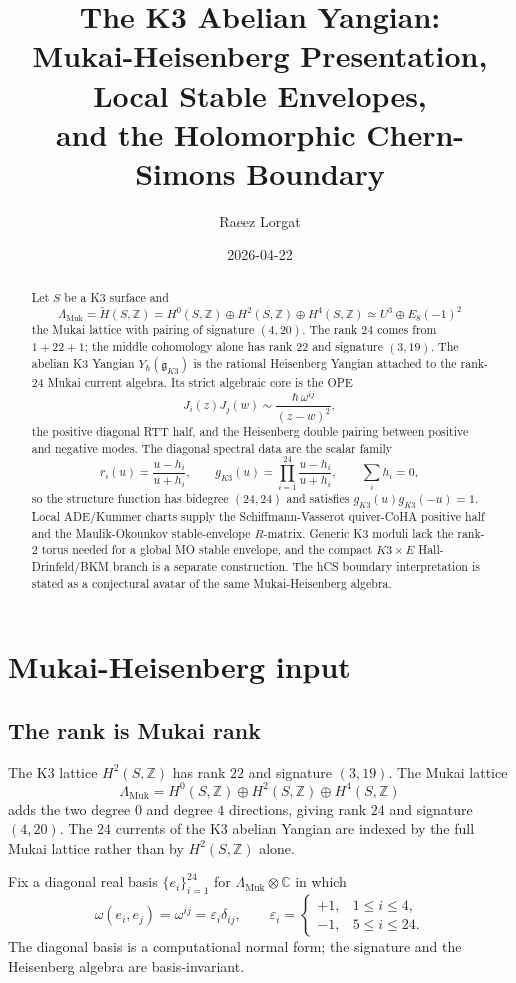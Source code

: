 \documentclass[11pt]{article}
\title{The K3 Abelian Yangian:\\
Mukai-Heisenberg Presentation, Local Stable Envelopes,\\
and the Holomorphic Chern-Simons Boundary}
\author{Raeez Lorgat}
\date{2026-04-22}
\theoremstyle{definition}
\newcommand{\C}{\mathbb{C}}
\newcommand{\Z}{\mathbb{Z}}
\renewcommand{\gg}{\mathfrak{g}}
\newcommand{\Lmuk}{\Lambda_{\mathrm{Muk}}}
\newcommand{\YgK}{Y_\hbar(\gg_{K3})}
\begin{document}
\maketitle

\begin{abstract}
Let $S$ be a K3 surface and
\[
  \Lmuk=\widetilde H(S,\Z)=H^0(S,\Z)\oplus H^2(S,\Z)\oplus H^4(S,\Z)
  \simeq U^3\oplus E_8(-1)^2
\]
the Mukai lattice with pairing of signature $(4,20)$. The rank $24$
comes from $1+22+1$; the middle cohomology alone has rank $22$ and
signature $(3,19)$. The abelian K3 Yangian $\YgK$ is the rational
Heisenberg Yangian attached to the rank-$24$ Mukai current algebra. Its
strict algebraic core is the OPE
\[
  J_i(z)J_j(w)\sim \frac{\hbar\,\omega^{ij}}{(z-w)^2},
\]
the positive diagonal RTT half, and the Heisenberg double pairing between
positive and negative modes. The diagonal spectral data are the scalar
family
\[
  r_i(u)=\frac{u-h_i}{u+h_i}, \qquad
  g_{K3}(u)=\prod_{i=1}^{24}\frac{u-h_i}{u+h_i},
  \qquad \sum_i h_i=0,
\]
so the structure function has bidegree $(24,24)$ and satisfies
$g_{K3}(u)g_{K3}(-u)=1$. Local ADE/Kummer charts supply the
Schiffmann-Vasserot quiver-CoHA positive half and the Maulik-Okounkov
stable-envelope $R$-matrix. Generic K3 moduli lack the rank-$2$ torus
needed for a global MO stable envelope, and the compact $K3\times E$
Hall-Drinfeld/BKM branch is a separate construction. The hCS boundary
interpretation is stated as a conjectural avatar of the same
Mukai-Heisenberg algebra.
\end{abstract}

\tableofcontents

\section{Mukai-Heisenberg input}
\label{sec:mukai-heisenberg-input}

\subsection{The rank is Mukai rank}

The K3 lattice $H^2(S,\Z)$ has rank $22$ and signature $(3,19)$. The
Mukai lattice
\[
  \Lmuk=H^0(S,\Z)\oplus H^2(S,\Z)\oplus H^4(S,\Z)
\]
adds the two degree $0$ and degree $4$ directions, giving rank $24$ and
signature $(4,20)$. The $24$ currents of the K3 abelian Yangian are
indexed by the full Mukai lattice rather than by $H^2(S,\Z)$ alone.

Fix a diagonal real basis $\{e_i\}_{i=1}^{24}$ for
$\Lmuk\otimes\C$ in which
\[
  \omega(e_i,e_j)=\omega^{ij}=\varepsilon_i\delta_{ij},
  \qquad
  \varepsilon_i=
  \begin{cases}
    +1,&1\leq i\leq4,\\
    -1,&5\leq i\leq24.
  \end{cases}
\]
The diagonal basis is a computational normal form; the signature and the
Heisenberg algebra are basis-invariant.
\end{document}
